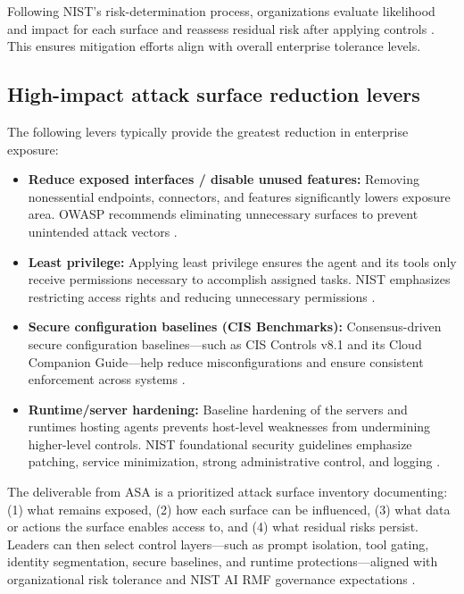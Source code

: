 \begin{TNtwocol}
      Following NIST's risk-determination process, organizations evaluate likelihood and impact for each surface and reassess residual risk after applying controls \cite{NIST_SP800_12R1}. This ensures mitigation efforts align with overall enterprise tolerance levels.

      \subsection{High-impact attack surface reduction levers}

      The following levers typically provide the greatest reduction in enterprise exposure:

      \begin{itemize}
            \item \textbf{Reduce exposed interfaces / disable unused features:} Removing nonessential endpoints, connectors, and features significantly lowers exposure area. OWASP recommends eliminating unnecessary surfaces to prevent unintended attack vectors \cite{OWASP_LLM_Top10}.
            \item \textbf{Least privilege:} Applying least privilege ensures the agent and its tools only receive permissions necessary to accomplish assigned tasks. NIST emphasizes restricting access rights and reducing unnecessary permissions \cite{NIST_SP800_12R1}.
            \item \textbf{Secure configuration baselines (CIS Benchmarks):} Consensus-driven secure configuration baselines—such as CIS Controls v8.1 and its Cloud Companion Guide—help reduce misconfigurations and ensure consistent enforcement across systems \cite{CIS_Controls_v8_1,CIS_Cloud_Companion_v8_1}.
            \item \textbf{Runtime/server hardening:} Baseline hardening of the servers and runtimes hosting agents prevents host-level weaknesses from undermining higher-level controls. NIST foundational security guidelines emphasize patching, service minimization, strong administrative control, and logging \cite{NIST_SP800_12R1}.
      \end{itemize}

      The deliverable from ASA is a prioritized attack surface inventory documenting: (1) what remains exposed, (2) how each surface can be influenced, (3) what data or actions the surface enables access to, and (4) what residual risks persist. Leaders can then select control layers—such as prompt isolation, tool gating, identity segmentation, secure baselines, and runtime protections—aligned with organizational risk tolerance and NIST AI RMF governance expectations \cite{NIST_AI_RMF_100_1,NIST_GenAI_Profile_600_1}.


\end{TNtwocol}
